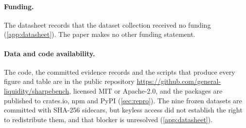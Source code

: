 \paragraph{Funding.} The datasheet records that the dataset collection received no funding (\cref{app:datasheet}). The paper makes no other funding statement.

\paragraph{Data and code availability.} The code, the committed evidence records and the scripts that produce every figure and table are in the public repository \url{https://github.com/general-liquidity/sharpebench}, licensed MIT or Apache-2.0, and the packages are published to crates.io, npm and PyPI (\cref{sec:repro}). The nine frozen datasets are committed with SHA-256 sidecars, but keyless access did not establish the right to redistribute them, and that blocker is unresolved (\cref{app:datasheet}).
